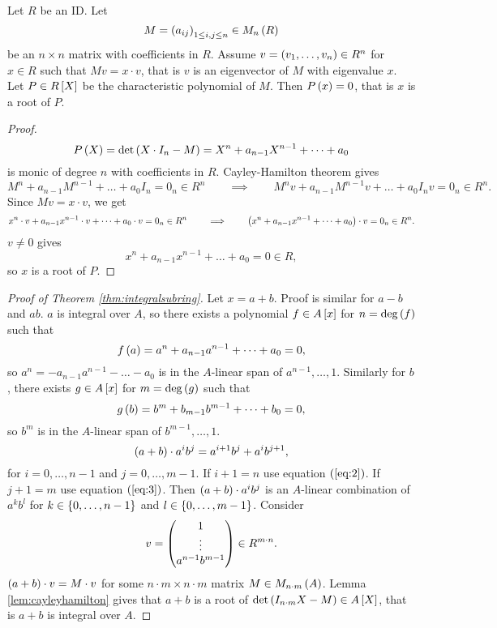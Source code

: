 \begin{lemma}
\label{lem:cayleyhamilton}
Let $ R $ be an ID. Let
$$ M = \rb{a_{ij}}_{1 \le i, j \le n} \in M_n\rb{R} $$
be an $ n \times n $ matrix with coefficients in $ R $. Assume $ v = \rb{v_1, \dots, v_n} \in R^n $ for $ x \in R $ such that $ Mv = x \cdot v $, that is $ v $ is an eigenvector of $ M $ with eigenvalue $ x $. Let $ P \in R\sb{X} $ be the characteristic polynomial of $ M $. Then $ P\rb{x} = 0 $, that is $ x $ is a root of $ P $.
\end{lemma}

\begin{proof}
$$ P\rb{X} = \det\rb{X \cdot I_n - M} = X^n + a_{n - 1}X^{n - 1} + \dots + a_0 $$
is monic of degree $ n $ with coefficients in $ R $. Cayley-Hamilton theorem gives
$$ M^n + a_{n - 1}M^{n - 1} + \dots + a_0I_n = 0_n \in R^n \qquad \implies \qquad M^nv + a_{n - 1}M^{n - 1}v + \dots + a_0I_nv = 0_n \in R^n. $$
Since $ Mv = x \cdot v $, we get
$$ x^n \cdot v + a_{n - 1}x^{n - 1} \cdot v + \dots + a_0 \cdot v = 0_n \in R^n \qquad \implies \qquad \rb{x^n + a_{n - 1}x^{n - 1} + \dots + a_0} \cdot v = 0_n \in R^n. $$
$ v \ne 0 $ gives
$$ x^n + a_{n - 1}x^{n - 1} + \dots + a_0 = 0 \in R, $$
so $ x $ is a root of $ P $.
\end{proof}

\begin{proof}[Proof of Theorem \ref{thm:integralsubring}]
Let $ x = a + b $. Proof is similar for $ a - b $ and $ ab $. $ a $ is integral over $ A $, so there exists a polynomial $ f \in A\sb{x} $ for $ n = \deg\rb{f} $ such that
\begin{equation}
\label{eq:2}
f\rb{a} = a^n + a_{n - 1}a^{n - 1} + \dots + a_0 = 0,
\end{equation}
so $ a^n = -a_{n - 1}a^{n - 1} - \dots - a_0 $ is in the $ A $-linear span of $ a^{n - 1}, \dots, 1 $. Similarly for $ b $, there exists $ g \in A\sb{x} $ for $ m = \deg\rb{g} $ such that
\begin{equation}
\label{eq:3}
g\rb{b} = b^m + b_{m - 1}b^{m - 1} + \dots + b_0 = 0,
\end{equation}
so $ b^m $ is in the $ A $-linear span of $ b^{m - 1}, \dots, 1 $.
$$ \rb{a + b} \cdot a^ib^j = a^{i + 1}b^j + a^ib^{j + 1}, $$
for $ i = 0, \dots, n - 1 $ and $ j = 0, \dots, m - 1 $. If $ i + 1 = n $ use equation $ \rb{\ref{eq:2}} $. If $ j + 1 = m $ use equation $ \rb{\ref{eq:3}} $. Then $ \rb{a + b} \cdot a^ib^j $ is an $ A $-linear combination of $ a^kb^l $ for $ k \in \cb{0, \dots, n - 1} $ and $ l \in \cb{0, \dots, m - 1} $. Consider
$$ v = \threebyone{1}{\vdots}{a^{n - 1}b^{m - 1}} \in R^{m \cdot n}. $$
$ \rb{a + b} \cdot v = M \cdot v $ for some $ n \cdot m \times n \cdot m $ matrix $ M \in M_{n \cdot m}\rb{A} $. Lemma \ref{lem:cayleyhamilton} gives that $ a + b $ is a root of $ \det\rb{I_{n \cdot m}X - M} \in A\sb{X} $, that is $ a + b $ is integral over $ A $.
\end{proof}

